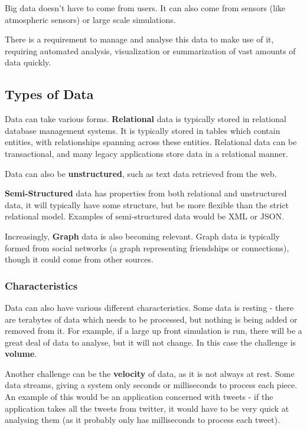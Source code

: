 \documentclass{article}
\begin{document}
{\begin{itemize}
Big data doesn't have to come from users. It can also come from sensors (like atmospheric sensors) or large scale simulations.

There is a requirement to manage and analyse this data to make use of it, requiring automated analysis, visualization or summarization of vast amounts of data quickly. 

\subsection{Types of Data}
Data can take various forms. \textbf{Relational} data is typically stored in relational database management systems. It is typically stored in tables which contain entities, with relationships spanning across these entities. Relational data can be transactional, and many legacy applications store data in a relational manner. 

Data can also be \textbf{unstructured}, such as text data retrieved from the web. 

\textbf{Semi-Structured} data has properties from both relational and unstructured data, it will typically have some structure, but be more flexible than the strict relational model. Examples of semi-structured data would be XML or JSON. 

Increasingly, \textbf{Graph} data is also becoming relevant. Graph data is typically formed from social networks (a graph representing friendships or connections), though it could come from other sources.

\subsubsection{Characteristics}
Data can also have various different characteristics. Some data is resting - there are terabytes of data which needs to be processed, but nothing is being added or removed from it. For example, if a large up front simulation is run, there will be a great deal of data to analyse, but it will not change. In this case the challenge is \textbf{volume}.

Another challenge can be the \textbf{velocity} of data, as it is not always at rest. Some data streams, giving a system only seconds or milliseconds to process each piece. An example of this would be an application concerned with tweets - if the application takes all the tweets from twitter, it would have to be very quick at analysing them (as it probably only has milliseconds to process each tweet).


\end{itemize}}
\end{document}
